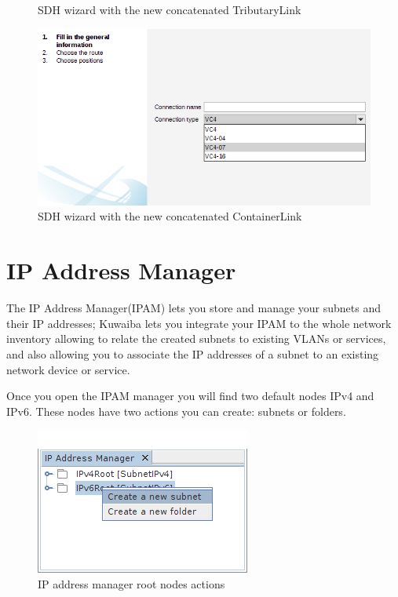 \documentclass[a4paper]{article}
\begin{document}
\begin{enumerate}
\begin{figure}[h!]
				\caption{SDH wizard with the new concatenated TributaryLink}
				\label{fig:sdh_module_new_concatenated_tributary_link}
			\end{figure}
			\begin{figure}[h!]
				\centering
				\includegraphics[width=0.7\linewidth]{img/sdh_module_wizard_concatenated_container.png}
				\caption{SDH wizard with the new concatenated ContainerLink}
				\label{fig:sdh_module_new_concatenated_container_link}
			\end{figure}
			
		\end{enumerate}
		\clearpage
		\section{IP Address Manager}\label{sec:ip_address_manager}
		The IP Address Manager(IPAM) lets you store and manage your subnets and their IP addresses; Kuwaiba lets you integrate your IPAM to the whole network inventory allowing to relate the created subnets to existing VLANs or services, and also allowing you to associate the IP addresses of a subnet to an existing network device or service.
		
		Once you open the IPAM manager you will find two default nodes IPv4 and IPv6.
		These nodes have two actions you can create: subnets or folders.
		\begin{figure}[h!]
			\centering
			\includegraphics[width=0.4\linewidth]{img/ipam_root_nodes_actions.png}
			\caption{IP address manager root nodes actions}
			\label{fig:ipam_root_nodes_actions}
		\end{figure}
		
\end{document}
